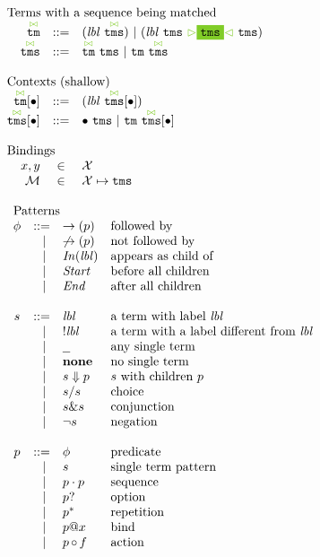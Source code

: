 \documentclass{article}
\makeatletter
\newcommand{\cursorColor}{LimeGreen}
\newcommand{\lbl}{\ensuremath{\mathit{lbl}}}
\newcommand{\tm}{\ensuremath{\mathtt{tm}}}
\newcommand{\tms}{\ensuremath{\mathtt{tms}}}
\newcommand{\Tmc}{\ensuremath{\overset{ \textcolor{\cursorColor}{\bowtie}}{\tm}}}
\newcommand{\Tmcs}{\ensuremath{\overset{\textcolor{\cursorColor}{\bowtie}}{\tms}}}
\newcommand{\mstart}{\ensuremath{\textcolor{\cursorColor}{\rhd}}}
\newcommand{\mend}{\ensuremath{\textcolor{\cursorColor}{\lhd}}}
\newcommand{\bindings}{\ensuremath{\mathcal{M}}}
\newcommand{\select}[1]{\mstart\colorbox{\cursorColor}{$#1$}\mend}
\newcommand{\pseq}[2]{\ensuremath{#1 \cdot #2}}
\newcommand{\por}[2]{\ensuremath{#1/#2}}
\newcommand{\pand}[2]{\ensuremath{#1\&#2}}
\newcommand{\children}[2]{\ensuremath{#1} \Downarrow #2}
\newcommand{\pnot}[1]{\ensuremath{\lnot #1}}
\newcommand{\maybe}[1]{\ensuremath{#1?}}
\newcommand{\many}[1]{\ensuremath{#1^*}}
\newcommand{\any}{\ensuremath{\text{\underline{\hspace{0.6em}}}}}
\newcommand{\none}{\ensuremath{\mathbf{none}}}
\newcommand{\bind}[2]{\ensuremath{#1@#2}}
\newcommand{\paction}[2]{\ensuremath{#1\mathop{\circ} #2}}
\newcommand{\fb}[1]{\ensuremath{\rightarrow(#1)}}
\newcommand{\nfb}[1]{\ensuremath{\not\rightarrow(#1)}}
\newcommand{\pin}[1]{\ensuremath{\mathit{In}(#1)}}
\newcommand{\pstart}{\ensuremath{\mathit{Start}}}
\newcommand{\pend}{\ensuremath{\mathit{End}}}
\newcommand{\arrayheading}[2]{\multicolumn{#1}{l}{\mbox{#2}}}
\makeatother
\begin{document}
\[
  \begin{array}{rcl}
    \arrayheading{3}{Terms with a sequence being matched}\\
    \Tmc & ::= & (\lbl~\Tmcs) ~|~ (\lbl~\tms~\select{\tms}~\tms)\\
    \Tmcs & ::= & \Tmc ~ \tms ~|~ \tm ~ \Tmcs\\
    \\
    \arrayheading{3}{Contexts (shallow)}\\
    \Tmc[\bullet] & ::= & (\lbl~\Tmcs[\bullet])\\
    \Tmcs[\bullet] & ::= & \bullet ~ \tms ~|~ \tm ~ \Tmcs[\bullet]\\
    \\
    \arrayheading{3}{Bindings}\\
    x, y      & \in & \mathcal{X}\\
    \bindings & \in & \mathcal{X} \mapsto \tms\\
    \\
    \multicolumn{3}{l}{
    \begin{array}{crll}
      \arrayheading{4}{Patterns}\\
      \phi & ::= & \fb{p} & \text{followed by}\\
           & ~|~ & \nfb{p} & \text{not followed by}\\
           & ~|~ & \pin{\lbl} & \text{appears as child of}\\
           & ~|~ & \pstart{} & \text{before all children}\\
           & ~|~ & \pend{} & \text{after all children}\\
      \\
      s & ::= & \lbl & \text{a term with label $\lbl$}\\
        & ~|~ & !\lbl & \text{a term with a label different from $\lbl$}\\
        & ~|~ & \any{} & \text{any single term}\\
        & ~|~ & \none{} & \text{no single term}\\
        & ~|~ & \children{s}{p} & \text{$s$ with children $p$}\\
        & ~|~ & \por{s}{s} & \text{choice}\\
        & ~|~ & \pand{s}{s} & \text{conjunction}\\
        & ~|~ & \pnot{s} & \text{negation}\\
      \\
      p & ::= & \phi & \text{predicate}\\
        & ~|~ & s & \text{single term pattern}\\
        & ~|~ & \pseq{p}{p} & \text{sequence}\\
        & ~|~ & \maybe{p} & \text{option}\\
        & ~|~ & \many{p} & \text{repetition}\\
        & ~|~ & \bind{p}{x} & \text{bind}\\
        & ~|~ & \paction{p}{f} & \text{action}\\
    \end{array}
    }
  \end{array}
\]
\end{document}
